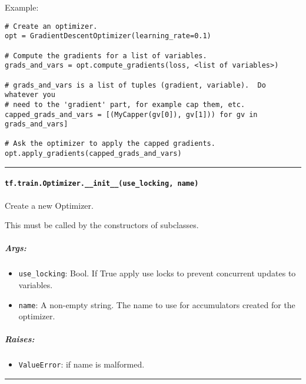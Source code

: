 Example:

\begin{verbatim}
# Create an optimizer.
opt = GradientDescentOptimizer(learning_rate=0.1)

# Compute the gradients for a list of variables.
grads_and_vars = opt.compute_gradients(loss, <list of variables>)

# grads_and_vars is a list of tuples (gradient, variable).  Do whatever you
# need to the 'gradient' part, for example cap them, etc.
capped_grads_and_vars = [(MyCapper(gv[0]), gv[1])) for gv in grads_and_vars]

# Ask the optimizer to apply the capped gradients.
opt.apply_gradients(capped_grads_and_vars)
\end{verbatim}

\begin{center}\rule{0.5\linewidth}{\linethickness}\end{center}

\paragraph{\texorpdfstring{\texttt{tf.train.Optimizer.\_\_init\_\_(use\_locking,\ name)}
}{tf.train.Optimizer.\_\_init\_\_(use\_locking, name) }}\label{tf.train.optimizer.ux5fux5finitux5fux5fuseux5flocking-name}

Create a new Optimizer.

This must be called by the constructors of subclasses.

\subparagraph{Args: }\label{args}

\begin{itemize}
\tightlist
\item
  \texttt{use\_locking}: Bool. If True apply use locks to prevent
  concurrent updates to variables.
\item
  \texttt{name}: A non-empty string. The name to use for accumulators
  created for the optimizer.
\end{itemize}

\subparagraph{Raises: }\label{raises}

\begin{itemize}
\tightlist
\item
  \texttt{ValueError}: if name is malformed.
\end{itemize}

\begin{center}\rule{0.5\linewidth}{\linethickness}\end{center}

